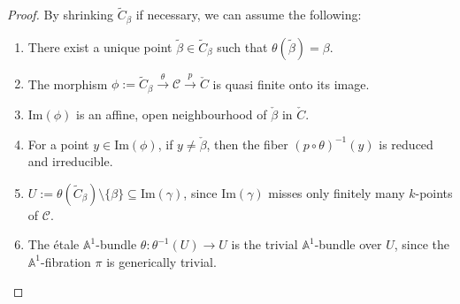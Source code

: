 \documentclass[11pt, reqno]{amsart}
\theoremstyle{plain}
\theoremstyle{definition}
\renewcommand{\tilde}{\widetilde}
\newcommand{\sC}{{\mathcal C}}
\newcommand{\A}{{\mathbb A}}
\begin{document}
\begin{proof}
            By shrinking $\tilde{C}_\beta$ if necessary, we can assume the following:
			\begin{enumerate}
			\item There exist a unique point $\tilde{\beta}\in \tilde{C}_\beta$ such that $\theta(\tilde{\beta}) = \beta.$ 
			\item The morphism $\phi:= \tilde{C}_\beta \xrightarrow{\theta} \sC \xrightarrow{p} \check{C}$
            is quasi finite onto its image.
			\item Im$(\phi)$ is an affine, open neighbourhood of $\check{\beta}$ in $\check{C}$.
			\item For a point $y \in \text{Im}(\phi)$, if $y \neq \check{\beta}$, then the fiber $(p \circ \theta)^{-1}(y)$ is reduced and irreducible.
			\item $U:=\theta(\tilde{C}_\beta) \setminus \{\beta\} \subseteq \text{Im}(\gamma)$, since $\text{Im}(\gamma)$ misses only finitely many $k$-points of $\sC$.
            \item The \'etale $\A^1$-bundle $\theta: \theta^{-1}(U) \to U$ is the trivial $\A^1$-bundle over $U$, since the $\A^1$-fibration $\pi$ is generically trivial.
			\end{enumerate}
			
 	
 		

\end{proof}
\end{document}
